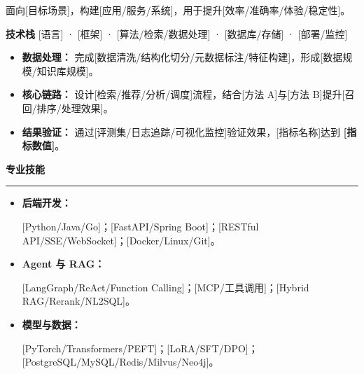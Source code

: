 \documentclass[11pt,a4paper]{ctexart}
\newcommand{\resumeSection}[1]{%
  \par\vspace{0.58em}
  \noindent
  {\fontsize{14.2pt}{16.5pt}\selectfont\bfseries
    \textcolor{ResumeAccent}{\raisebox{-0.10em}{\rule{3.8pt}{1.04em}}}
    \hspace{0.48em}#1
  }
  \par\vspace{-0.40em}
  \textcolor{ResumeAccent}{\rule{\textwidth}{0.58pt}}
  \par\vspace{0.10em}
}
\newcommand{\projectSummary}[1]{%
  \noindent
  \textcolor{TextGray}{#1}
  \par\vspace{0.38em}
}
\newcommand{\projectTech}[1]{%
  \noindent
  {\small
    \textcolor{ResumeAccent}{\textbf{技术栈}}
    \hspace{0.6em}
    \textcolor{TextGray}{#1}
  }
  \par\vspace{0.25em}
}
\newcommand{\skillLabel}[1]{%
  \textcolor{ResumeAccent}{\textbf{#1}}
}
\begin{document}
\projectSummary{
  面向[目标场景]，构建[应用/服务/系统]，用于提升[效率/准确率/体验/稳定性]。
}

\projectTech{
[语言] · [框架] · [算法/检索/数据处理] · [数据库/存储] · [部署/监控]
}

\begin{itemize}

\item
\textbf{数据处理：}
完成[数据清洗/结构化切分/元数据标注/特征构建]，形成[数据规模/知识库规模]。

\item
\textbf{核心链路：}
设计[检索/推荐/分析/调度]流程，结合[方法 A]与[方法 B]提升[召回/排序/处理效果]。

\item
\textbf{结果验证：}
通过[评测集/日志追踪/可视化监控]验证效果，[指标名称]达到 \textbf{[指标数值]}。

\end{itemize}

\resumeSection{专业技能}

\begin{itemize}

  \item
  \skillLabel{后端开发：}
  [Python/Java/Go]；[FastAPI/Spring Boot]；[RESTful API/SSE/WebSocket]；[Docker/Linux/Git]。

  \item
  \skillLabel{Agent 与 RAG：}
  [LangGraph/ReAct/Function Calling]；[MCP/工具调用]；[Hybrid RAG/Rerank/NL2SQL]。

  \item
  \skillLabel{模型与数据：}
  [PyTorch/Transformers/PEFT]；[LoRA/SFT/DPO]；[PostgreSQL/MySQL/Redis/Milvus/Neo4j]。

\end{itemize}
\end{document}
